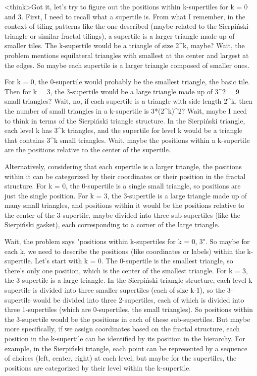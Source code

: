 <think>Got it, let's try to figure out the positions within k-supertiles for k = 0 and 3. First, I need to recall what a supertile is. From what I remember, in the context of tiling patterns like the one described (maybe related to the Sierpiński triangle or similar fractal tilings), a supertile is a larger triangle made up of smaller tiles. The k-supertile would be a triangle of size 2^k, maybe? Wait, the problem mentions equilateral triangles with smallest at the center and largest at the edges. So maybe each supertile is a larger triangle composed of smaller ones. 

For k = 0, the 0-supertile would probably be the smallest triangle, the basic tile. Then for k = 3, the 3-supertile would be a large triangle made up of 3^2 = 9 small triangles? Wait, no, if each supertile is a triangle with side length 2^k, then the number of small triangles in a k-supertile is 3*(2^k)^2? Wait, maybe I need to think in terms of the Sierpiński triangle structure. In the Sierpiński triangle, each level k has 3^k triangles, and the supertile for level k would be a triangle that contains 3^k small triangles. Wait, maybe the positions within a k-supertile are the positions relative to the center of the supertile. 

Alternatively, considering that each supertile is a larger triangle, the positions within it can be categorized by their coordinates or their position in the fractal structure. For k = 0, the 0-supertile is a single small triangle, so positions are just the single position. For k = 3, the 3-supertile is a large triangle made up of many small triangles, and positions within it would be the positions relative to the center of the 3-supertile, maybe divided into three sub-supertiles (like the Sierpiński gasket), each corresponding to a corner of the large triangle. 

Wait, the problem says "positions within k-supertiles for k = 0, 3". So maybe for each k, we need to describe the positions (like coordinates or labels) within the k-supertile. Let's start with k = 0. The 0-supertile is the smallest triangle, so there's only one position, which is the center of the smallest triangle. For k = 3, the 3-supertile is a large triangle. In the Sierpiński triangle structure, each level k supertile is divided into three smaller supertiles (each of size k-1), so the 3-supertile would be divided into three 2-supertiles, each of which is divided into three 1-supertiles (which are 0-supertiles, the small triangles). So positions within the 3-supertile would be the positions in each of these sub-supertiles. But maybe more specifically, if we assign coordinates based on the fractal structure, each position in the k-supertile can be identified by its position in the hierarchy. For example, in the Sierpiński triangle, each point can be represented by a sequence of choices (left, center, right) at each level, but maybe for the supertiles, the positions are categorized by their level within the k-supertile. 

